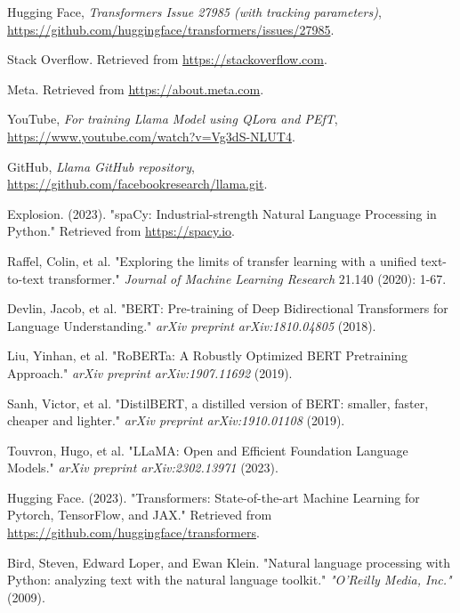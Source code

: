 \documentclass[final,3p,times,authoryear]{elsarticle}
\begin{document}
\begin{thebibliography}{99}
        Hugging Face, \emph{Transformers Issue 27985 (with tracking parameters)}, \href{https://github.com/huggingface/transformers/issues/27985}{https://github.com/huggingface/transformers/issues/27985}.

        Stack Overflow. Retrieved from \url{https://stackoverflow.com}.

        Meta. Retrieved from \url{https://about.meta.com}.

        YouTube, \emph{For training Llama Model using QLora and PEfT}, \href{https://www.youtube.com/watch?v=Vg3dS-NLUT4}{https://www.youtube.com/watch?v=Vg3dS-NLUT4}.

        GitHub, \emph{Llama GitHub repository}, \href{https://github.com/facebookresearch/llama.git}{https://github.com/facebookresearch/llama.git}.

        Explosion. (2023). "spaCy: Industrial-strength Natural Language Processing in Python." Retrieved from \url{https://spacy.io}.

        Raffel, Colin, et al. "Exploring the limits of transfer learning with a unified text-to-text transformer." \emph{Journal of Machine Learning Research} 21.140 (2020): 1-67.

        Devlin, Jacob, et al. "BERT: Pre-training of Deep Bidirectional Transformers for Language Understanding." \emph{arXiv preprint arXiv:1810.04805} (2018).

        Liu, Yinhan, et al. "RoBERTa: A Robustly Optimized BERT Pretraining Approach." \emph{arXiv preprint arXiv:1907.11692} (2019).

        Sanh, Victor, et al. "DistilBERT, a distilled version of BERT: smaller, faster, cheaper and lighter." \emph{arXiv preprint arXiv:1910.01108} (2019).

        Touvron, Hugo, et al. "LLaMA: Open and Efficient Foundation Language Models." \emph{arXiv preprint arXiv:2302.13971} (2023).

        Hugging Face. (2023). "Transformers: State-of-the-art Machine Learning for Pytorch, TensorFlow, and JAX." Retrieved from \url{https://github.com/huggingface/transformers}.

        Bird, Steven, Edward Loper, and Ewan Klein. "Natural language processing with Python: analyzing text with the natural language toolkit." \emph{"O'Reilly Media, Inc."} (2009).


\end{thebibliography}
\end{document}
